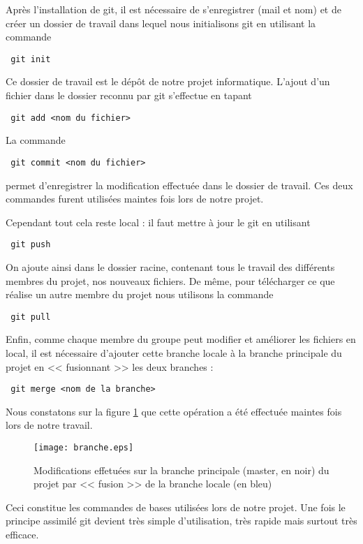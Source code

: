 Apr\`es l'installation de git, il est n\'ecessaire de s'enregistrer (mail et nom) et de cr\'eer un dossier de travail dans lequel nous 
initialisons git en utilisant la commande
\begin{verbatim} git init \end{verbatim}
Ce dossier de travail est le d\'ep\^ot de notre projet informatique. L'ajout d'un fichier dans le dossier reconnu par git s'effectue en tapant
\begin{verbatim} git add <nom du fichier> \end{verbatim}
La commande
\begin{verbatim} git commit <nom du fichier> \end{verbatim} permet d'enregistrer la modification effectu\'ee dans le dossier de travail.
Ces deux commandes furent utilis\'ees maintes fois lors de notre projet. 

Cependant tout cela reste local : il faut mettre \`a jour le git en utilisant
\begin{verbatim} git push \end{verbatim}
On ajoute ainsi dans le dossier racine, contenant tous le travail des diff\'erents membres du projet, nos nouveaux fichiers. 
De m\^eme, pour t\'el\'echarger ce que r\'ealise un autre membre du projet nous utilisons la commande
\begin{verbatim} git pull \end{verbatim}

Enfin, comme chaque membre du groupe peut modifier et am\'eliorer les fichiers en local, il est n\'ecessaire d'ajouter cette branche locale \`a la branche
principale du projet en << fusionnant >> les deux branches :
\begin{verbatim} git merge <nom de la branche>\end{verbatim}
Nous constatons sur la figure \ref{fig:branche} que cette op\'eration a \'et\'e effectu\'ee maintes fois lors de notre travail.

\begin{figure}[h]
\begin{center}
\texttt{[image: branche.eps]}
\end{center}
\caption{Modifications effetu\'ees sur la branche principale (master, en noir) du projet par << fusion >> de la branche locale (en bleu)}
\label{fig:branche}
\end{figure}

Ceci constitue les commandes de bases utilis\'ees lors de notre projet. Une fois le principe assimil\'e git devient tr\`es simple d'utilisation,
 tr\`es rapide mais surtout tr\`es efficace.

